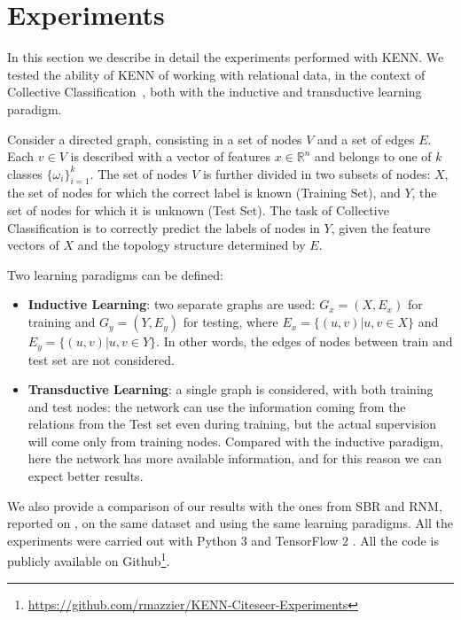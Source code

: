  
 
 \section{Experiments}
 \label{sec:kenn_experiments}
 
In this section we describe in detail the experiments performed with KENN. We tested the ability of KENN of working with relational data, in the context of Collective Classification~\cite{sen2008collective}, both with the inductive and transductive learning paradigm. 

\begin{definition}
Consider a directed graph, consisting in a set of nodes $V$ and a set of edges $E$. Each $v \in V$ is described with a vector of features $x\in \mathbb{R}^n$ and belongs to one of $k$ classes $\{\omega_i\}_{i=1}^k$. The set of nodes $V$ is further divided in two subsets of nodes: $X$, the set of nodes for which the correct label is known (Training Set), and $Y$, the set of nodes for which it is unknown (Test Set). The task of Collective Classification is to correctly predict the labels of nodes in $Y$, given the feature vectors of $X$ and the topology structure determined by $E$. 
\end{definition}
Two learning paradigms can be defined:

\begin{itemize}
	\item \textbf{Inductive Learning}: two separate graphs are used: $G_x = (X,E_x)$ for training and $G_y = (Y, E_y)$ for testing, where $E_x = \{(u,v) | u,v\in X\}$ and $E_y = \{(u,v) | u,v\in Y\}$. In other words, the edges of nodes between train and test set are not considered.
	\item \textbf{Transductive Learning}: a single graph is considered, with both training and test nodes: the network can use the information coming from the relations from the Test set even during training, but the actual supervision will come only from training nodes. Compared with the inductive paradigm, here the network has more available information, and for this reason we can expect better results.
\end{itemize}

We also provide a comparison of our results with the ones from SBR and RNM, reported on \cite{marra2020relational}, on the same dataset and using the same learning paradigms. All the experiments were carried out with Python 3 and TensorFlow 2 \cite{abadi2016tensorflow}. All the code is publicly available on Github\footnote{\url{https://github.com/rmazzier/KENN-Citeseer-Experiments}}.

